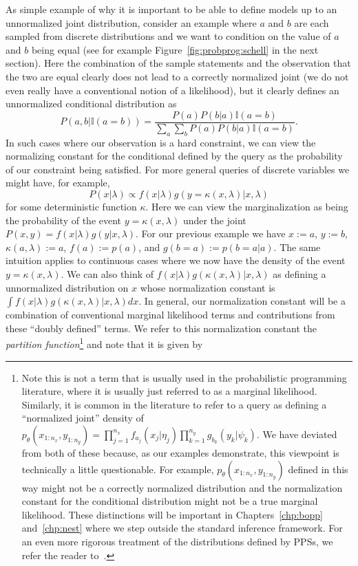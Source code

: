 As simple example of why it is important to be able to define models up to an unnormalized joint
distribution, consider an example where $a$ and $b$ are each sampled from discrete distributions
and we want to condition on the value of $a$ and $b$ being equal (see for example Figure~\ref{fig:probprog:schell}
in the next section).  Here
the combination of the sample statements and the observation that the two are equal clearly
does not lead to a correctly normalized joint (we do not even really have a conventional notion
of a likelihood), but it clearly defines an unnormalized conditional distribution as
\[
P(a,b | \mathbb{I}(a=b)) = \frac{P(a)P(b|a)\mathbb{I}(a=b)}{\sum_a \sum_b P(a)P(b|a) \mathbb{I}(a=b)}.
\]
In such cases where our observation is a hard constraint, we can view the normalizing constant for
the conditional defined by the query as the probability of our constraint being satisfied.  
For more general queries of discrete variables we might have, for example,
\[
P(x|\lambda) \propto f(x|\lambda)g(y=\kappa(x,\lambda)|x,\lambda)
\]
for some deterministic function $\kappa$.  Here we
can view the marginalization as being the probability of the event $y=\kappa(x,\lambda)$ under the joint $P(x,y)=f(x|\lambda)g(y|x,\lambda)$.
For our previous example we have $x:=a$, $y:=b$, $\kappa(a,\lambda):=a$, $f(a):=p(a)$, and $g(b=a):=p(b=a|a)$.
The same intuition applies to continuous cases where we now have the density of the event $y=\kappa(x,\lambda)$.
We can also think of $f(x|\lambda)g(\kappa(x,\lambda)|x,\lambda)$ as defining a unnormalized distribution on $x$ whose
normalization constant is $\int f(x|\lambda)g(\kappa(x,\lambda)|x,\lambda) dx$.  In general, our normalization
constant will be a combination of conventional marginal likelihood terms and contributions from these ``doubly defined''
terms. We refer to this normalization constant the \emph{partition function}\footnote{Note this is not a
	term that is usually used in the probabilistic programming literature, where it is usually just referred to as a marginal
	likelihood.  Similarly, it is common in the literature to refer to a query as defining a ``normalized 
	joint'' density of $p_{\theta}(x_{1:n_x},y_{1:n_y}) = \prod_{j=1}^{n_x} f_{a_j}(x_j | \eta_j)
	\prod_{k=1}^{n_y} g_{b_k}(y_k | \psi_k)$.  We have deviated from both of these because, as our examples
	demonstrate, this viewpoint is technically a little questionable.  For example, $p_{\theta}(x_{1:n_x},y_{1:n_y})$
	defined in this way might not be a correctly normalized distribution and the normalization constant
	for the conditional distribution might not be a true marginal likelihood.  These distinctions will be
	important in Chapters~\ref{chp:bopp} and~\ref{chp:nest} where we step outside the standard inference
	framework.  For an even more rigorous treatment of the distributions defined by PPSs, we refer the reader to~\cite{staton2016semantics}. 
	} and note that it is given by
